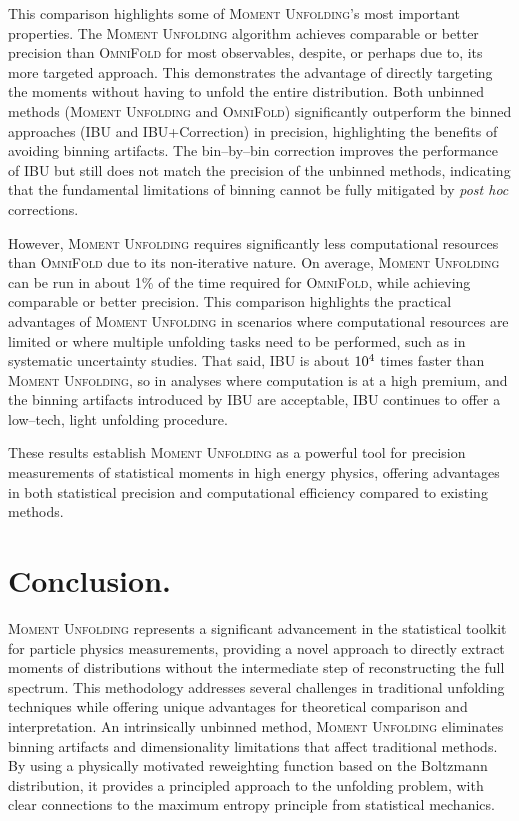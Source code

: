     This comparison highlights some of \textsc{Moment Unfolding}'s most important properties.
    The \textsc{Moment Unfolding} algorithm achieves comparable or better precision than \textsc{\textsc{OmniFold}} for most observables, despite, or perhaps due to, its more targeted approach.
    This demonstrates the advantage of directly targeting the moments without having to unfold the entire distribution.
    Both unbinned methods (\textsc{Moment Unfolding} and \textsc{\textsc{OmniFold}}) significantly outperform the binned approaches (IBU and IBU+Correction) in precision, highlighting the benefits of avoiding binning artifacts.
    The bin--by--bin correction improves the performance of IBU but still does not match the precision of the unbinned methods, indicating that the fundamental limitations of binning cannot be fully mitigated by \textit{post hoc} corrections.
    
    However, \textsc{Moment Unfolding} requires significantly less computational resources than \textsc{\textsc{OmniFold}} due to its non-iterative nature.
    On average, \textsc{Moment Unfolding} can be run in about 1\% of the time required for {\textsc{OmniFold}}, while achieving comparable or better precision.
    This comparison highlights the practical advantages of \textsc{Moment Unfolding} in scenarios where computational resources are limited or where multiple unfolding tasks need to be performed, such as in systematic uncertainty studies.
    That said, IBU is about \(\num{d4}\) times faster than \textsc{Moment Unfolding}, so in analyses where computation is at a high premium, and the binning artifacts introduced by IBU are acceptable, IBU continues to offer a low--tech, light unfolding procedure.

    These results establish \textsc{Moment Unfolding} as a powerful tool for precision measurements of statistical moments in high energy physics, offering advantages in both statistical precision and computational efficiency compared to existing methods.

\section{Conclusion.}
    \textsc{Moment Unfolding} represents a significant advancement in the statistical toolkit for particle physics measurements, providing a novel approach to directly extract moments of distributions without the intermediate step of reconstructing the full spectrum.
    This methodology addresses several challenges in traditional unfolding techniques while offering unique advantages for theoretical comparison and interpretation.
    An intrinsically unbinned method, \textsc{Moment Unfolding} eliminates binning artifacts and dimensionality limitations that affect traditional methods.
    By using a physically motivated reweighting function based on the Boltzmann distribution, it provides a principled approach to the unfolding problem, with clear connections to the maximum entropy principle from statistical mechanics.

